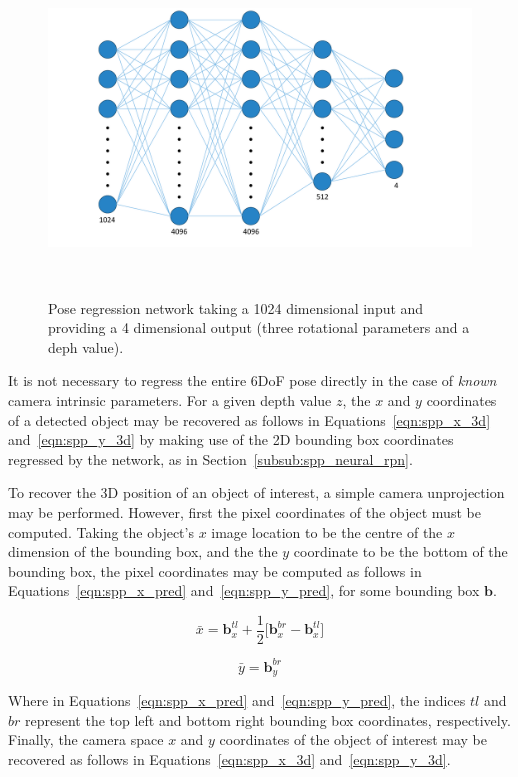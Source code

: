 \begin{figure}[!htbp]
  \centering
  \includegraphics[width=.8\linewidth]{figures/spp/pose_net_diagram.pdf}
  \caption[Pose Regression Network]{Pose regression network taking a 1024 dimensional 
  input and providing a 4 dimensional output (three rotational parameters and a deph value).}
~\label{figure:spp_pose_block}
\end{figure}

It is not necessary to regress the entire 6DoF pose directly in the case of \textit{known} camera intrinsic 
parameters. For a given depth value \( z \), the \( x \) and \( y \) coordinates of a detected object may 
be recovered as follows in Equations~\ref{eqn:spp_x_3d} and~\ref{eqn:spp_y_3d} by making use of the 2D bounding 
box coordinates regressed by the network, as in Section~\ref{subsub:spp_neural_rpn}.

To recover the 3D position of an object of interest, a simple camera unprojection may be performed. 
However, first the pixel coordinates of the object must be computed. Taking the object's \( x \) image 
location to be the centre of the \( x \) dimension of the bounding box, and the the \( y \) coordinate 
to be the bottom of the bounding box, the pixel coordinates may be computed as follows in 
Equations~\ref{eqn:spp_x_pred} and~\ref{eqn:spp_y_pred}, for some bounding box \( \bm{b} \).

\begin{equation}
  \label{eqn:spp_x_pred}
  \bar{x} = \bm{b}_{x}^{tl} + \frac{1}{2} \Big[ \bm{b}_{x}^{br} - \bm{b}_{x}^{tl} \Big]
\end{equation}

\begin{equation}
  \label{eqn:spp_y_pred}
  \bar{y} = \bm{b}_{y}^{br}
\end{equation}

Where in Equations~\ref{eqn:spp_x_pred} and~\ref{eqn:spp_y_pred}, the indices \( tl \) and \( br \) 
represent the top left and bottom right bounding box coordinates, respectively. Finally, the camera 
space \( x \) and \( y \) coordinates of the object of interest may be recovered as follows in 
Equations~\ref{eqn:spp_x_3d} and~\ref{eqn:spp_y_3d}.

